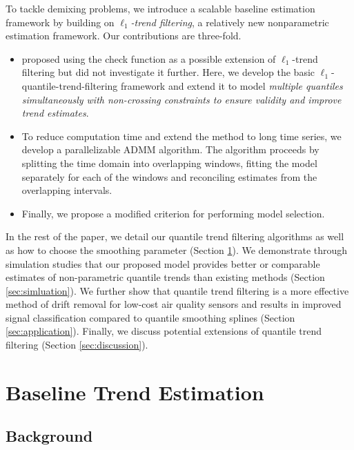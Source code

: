\documentclass[aoas]{imsart}
\begin{document}
To tackle demixing problems, we introduce a scalable baseline estimation framework by building on \textit{$\ell_1$-trend filtering}, a relatively new nonparametric estimation framework. Our contributions are three-fold.
\begin{itemize}
	\item \cite{Kim2009} proposed using the check function as a possible extension of $\ell_1$-trend filtering but did not investigate it further. Here, we develop the basic $\ell_1$-quantile-trend-filtering framework and extend it to model {\em multiple quantiles simultaneously with non-crossing constraints to ensure validity and improve trend estimates}.
	\item To reduce computation time and extend the method to long time series, we develop a parallelizable ADMM algorithm. The algorithm proceeds by splitting the time domain into overlapping windows, fitting the model separately for each of the windows and reconciling estimates from the overlapping intervals.
	\item Finally, we propose a modified criterion for performing model selection.
\end{itemize}

In the rest of the paper, we detail our quantile trend filtering algorithms as well as how to choose the smoothing parameter (Section \ref{sec:methods}). We demonstrate through simulation studies that our proposed model provides better or comparable estimates of non-parametric quantile trends than existing methods (Section \ref{sec:simluation}). We further show that quantile trend filtering is a more effective method of drift removal for low-cost air quality sensors and results in improved signal classification compared to quantile smoothing splines (Section \ref{sec:application}). Finally, we discuss potential extensions of quantile trend filtering (Section \ref{sec:discussion}).

\section{Baseline Trend Estimation}
\label{sec:methods}

\subsection{Background}
\end{document}
